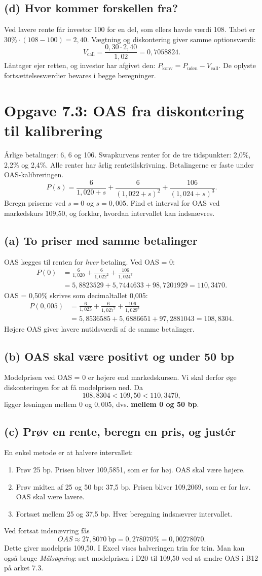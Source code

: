 \documentclass[11pt,a4paper]{article}
\newcommand{\opgave}[1]{\section*{#1}}
\newcommand{\del}[1]{\subsection*{#1}}
\newcommand{\bp}{\text{bp}}
\begin{document}
\del{(d) Hvor kommer forskellen fra?}
Ved lavere rente får investor 100 for en del, som ellers havde værdi 108. Tabet er $30\%\cdot(108-100)=2{,}40$. Vægtning og diskontering giver samme optionsværdi:
\[
V_{\mathrm{call}}=\frac{0{,}30\cdot2{,}40}{1{,}02}=0{,}7058824.
\]
Låntager ejer retten, og investor har afgivet den: $P_{\mathrm{konv}}=P_{\mathrm{uden}}-V_{\mathrm{call}}$.
De oplyste fortsættelsesværdier bevares i begge beregninger.

\newpage
\opgave{Opgave 7.3: OAS fra diskontering til kalibrering}
\begin{tcolorbox}[title=Opgavebeskrivelse]
Årlige betalinger: 6, 6 og 106. Swapkurvens renter for de tre tidspunkter: 2,0\%, 2,2\% og 2,4\%. Alle renter har årlig rentetilskrivning. Betalingerne er faste under OAS-kalibreringen.
\[
P(s)=\frac{6}{1{,}020+s}+\frac{6}{(1{,}022+s)^2}+\frac{106}{(1{,}024+s)^3}.
\]
Beregn priserne ved $s=0$ og $s=0{,}005$. Find et interval for OAS ved markedskurs 109,50, og forklar, hvordan intervallet kan indsnævres.
\end{tcolorbox}
\del{(a) To priser med samme betalinger}
OAS lægges til renten for \emph{hver} betaling. Ved OAS = 0:
\[
\begin{aligned}
P(0)&=\frac{6}{1{,}020}+\frac{6}{1{,}022^2}+\frac{106}{1{,}024^3}\\
&=5{,}8823529+5{,}7444633+98{,}7201929=\boxed{110{,}3470}.
\end{aligned}
\]
OAS = 0,50\% skrives som decimaltallet 0,005:
\[
\begin{aligned}
P(0{,}005)&=\frac{6}{1{,}025}+\frac{6}{1{,}027^2}+\frac{106}{1{,}029^3}\\
&=5{,}8536585+5{,}6886651+97{,}2881043=\boxed{108{,}8304}.
\end{aligned}
\]
Højere OAS giver lavere nutidsværdi af de samme betalinger.

\del{(b) OAS skal være positivt og under 50 bp}
Modelprisen ved OAS = 0 er højere end markedskursen. Vi skal derfor øge diskonteringen for at få modelprisen ned. Da
\[
108{,}8304<109{,}50<110{,}3470,
\]
ligger løsningen mellem $0$ og $0{,}005$, dvs. \textbf{mellem 0 og 50 bp}.

\del{(c) Prøv en rente, beregn en pris, og justér}
En enkel metode er at halvere intervallet:
\begin{enumerate}
\item Prøv 25 bp. Prisen bliver 109,5851, som er for høj. OAS skal være højere.
\item Prøv midten af 25 og 50 bp: 37,5 bp. Prisen bliver 109,2069, som er for lav. OAS skal være lavere.
\item Fortsæt mellem 25 og 37,5 bp. Hver beregning indsnævrer intervallet.
\end{enumerate}
Ved fortsat indsnævring fås
\[
\boxed{OAS\approx27{,}8070\ \bp=0{,}278070\%=0{,}00278070}.
\]
Dette giver modelpris 109,50. I Excel vises halveringen trin for trin. Man kan også bruge \emph{Målsøgning}: sæt modelprisen i D20 til 109,50 ved at ændre OAS i B12 på arket 7.3.
\end{document}
